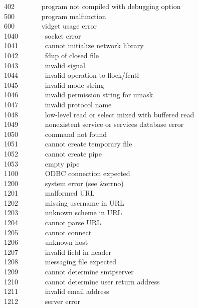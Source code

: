 402 \ \ \ \ \ \ \ program not compiled with debugging option\\
500 \ \ \ \ \ \ \ program malfunction\\
600 \ \ \ \ \ \ \ vidget usage error\\
1040 \ \ \ \ \ \ \ socket error \\
1041 \ \ \ \ \ \ \ cannot initialize network library \\
1042 \ \ \ \ \ \ \ fdup of closed file \\
1043 \ \ \ \ \ \ \ invalid signal \\
1044 \ \ \ \ \ \ \ invalid operation to flock/fcntl\\
1045 \ \ \ \ \ \ \ invalid mode string\\
1046 \ \ \ \ \ \ \ invalid permission string for umask\\
1047 \ \ \ \ \ \ \ invalid protocol name\\
1048 \ \ \ \ \ \ \ low-level read or select mixed with buffered read\\
1049 \ \ \ \ \ \ \ nonexistent service or services database error\\
1050 \ \ \ \ \ \ \ command not found\\
1051 \ \ \ \ \ \ \ cannot create temporary file\\
1052 \ \ \ \ \ \ \ cannot create pipe\\
1053 \ \ \ \ \ \ \ empty pipe\\
1100 \ \ \ \ \ \ \ ODBC connection expected\\
1200 \ \ \ \ \ \ \ system error (see \&errno)\\
1201 \ \ \ \ \ \ \ malformed URL\\
1202 \ \ \ \ \ \ \ missing username in URL\\
1203 \ \ \ \ \ \ \ unknown scheme in URL\\
1204 \ \ \ \ \ \ \ cannot parse URL\\
1205 \ \ \ \ \ \ \ cannot connect\\
1206 \ \ \ \ \ \ \ unknown host\\
1207 \ \ \ \ \ \ \ invalid field in header\\
1208 \ \ \ \ \ \ \ messaging file expected\\
1209 \ \ \ \ \ \ \ cannot determine smtpserver\\
1210 \ \ \ \ \ \ \ cannot determine user return address\\
1211 \ \ \ \ \ \ \ invalid email address\\
1212 \ \ \ \ \ \ \ server error\\
